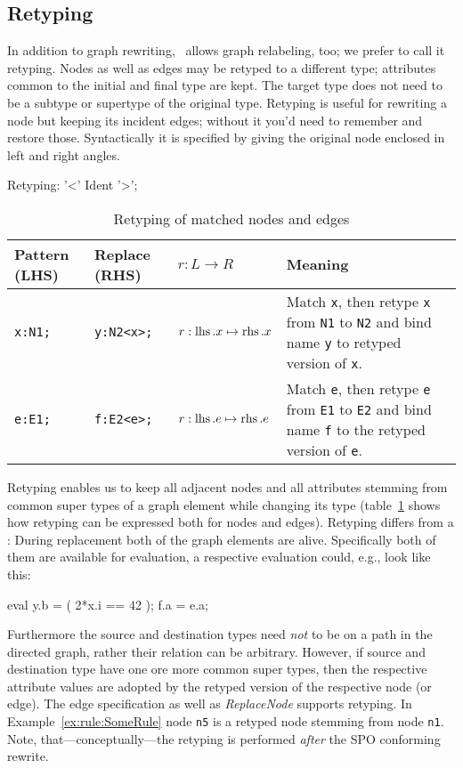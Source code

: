\subsection{Retyping} \label{sec:retype}
In addition to graph rewriting, \GrG\ allows graph relabeling\cite{Relabelling}, too; we prefer to call it retyping.
Nodes as well as edges may be retyped to a different type; attributes common to the initial and final type are kept.
The target type does not need to be a subtype or supertype of the original type.
Retyping is useful for rewriting a node but keeping its incident edges; without it you'd need to remember and restore those.
Syntactically it is specified by giving the original node enclosed in left and right angles.
\begin{rail}
  Retyping: '<' Ident '>';
\end{rail}

\begin{table}[htbp]
\centering
\begin{tabularx}{\linewidth}{lllX}
  \textbf{Pattern (LHS)} & \textbf{Replace (RHS)} & \textbf{$r: L \longrightarrow R$} & \textbf{Meaning} \\ \hline
  \texttt{x:N1;} & \texttt{y:N2<x>;}          & $r:\operatorname{lhs}.x \mapsto \operatorname{rhs}.x$ & Match \texttt{x}, then retype \texttt{x} from \texttt{N1} to \texttt{N2} and bind name \texttt{y} to retyped version of \texttt{x}.\\
  \texttt{e:E1;} & \texttt{f:E2<e>;}          & $r:\operatorname{lhs}.e \mapsto \operatorname{rhs}.e$ & Match \texttt{e}, then retype \texttt{e} from \texttt{E1} to \texttt{E2} and bind name \texttt{f} to the retyped version of \texttt{e}.\\
\end{tabularx}
\caption{Retyping of matched nodes and edges}
\label{rule:retyping_graphlets}
\end{table}

Retyping enables us to keep all adjacent nodes and all attributes stemming from common super types of a graph element while changing its type (table~\ref{rule:retyping_graphlets} shows how retyping can be expressed both for nodes and edges).
Retyping differs from a : During replacement both of the graph elements are alive.
  Specifically both of them are available for evaluation, a respective evaluation could, e.g., look like this:
  \begin{grgenlet}
eval {
  y.b = ( 2*x.i == 42 );
  f.a = e.a;
}
  \end{grgenlet}
Furthermore the source and destination types need \emph{not} to be on a path in the directed  graph, rather their relation can be arbitrary.
However, if source and destination type have one ore more common super types, then the respective attribute values are adopted by the retyped version of the respective node (or edge).
The edge specification as well as \emph{ReplaceNode} supports retyping.
In Example~\ref{ex:rule:SomeRule} node \texttt{n5} is a retyped node stemming from node \texttt{n1}.
Note, that---conceptually---the retyping is performed \emph{after} the SPO conforming rewrite.

